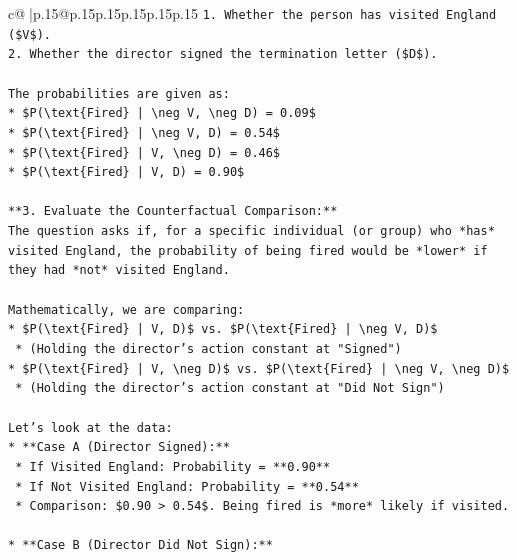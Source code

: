\documentclass{article}
\begin{document}
{\begin{supertabular}{c@{$\;$}|p{.15\linewidth}@{}p{.15\linewidth}p{.15\linewidth}p{.15\linewidth}p{.15\linewidth}p{.15\linewidth}}
{{{\texttt{1.  Whether the person has visited England (\$V\$).} \\
\texttt{2.  Whether the director signed the termination letter (\$D\$).} \\
\\ 
\texttt{The probabilities are given as:} \\
\texttt{*   \$P(\textbackslash{}text\{Fired\} | \textbackslash{}neg V, \textbackslash{}neg D) = 0.09\$} \\
\texttt{*   \$P(\textbackslash{}text\{Fired\} | \textbackslash{}neg V, D) = 0.54\$} \\
\texttt{*   \$P(\textbackslash{}text\{Fired\} | V, \textbackslash{}neg D) = 0.46\$} \\
\texttt{*   \$P(\textbackslash{}text\{Fired\} | V, D) = 0.90\$} \\
\\ 
\texttt{**3. Evaluate the Counterfactual Comparison:**} \\
\texttt{The question asks if, for a specific individual (or group) who *has* visited England, the probability of being fired would be *lower* if they had *not* visited England.} \\
\\ 
\texttt{Mathematically, we are comparing:} \\
\texttt{*   \$P(\textbackslash{}text\{Fired\} | V, D)\$ vs. \$P(\textbackslash{}text\{Fired\} | \textbackslash{}neg V, D)\$} \\
\texttt{    *   (Holding the director's action constant at "Signed")} \\
\texttt{*   \$P(\textbackslash{}text\{Fired\} | V, \textbackslash{}neg D)\$ vs. \$P(\textbackslash{}text\{Fired\} | \textbackslash{}neg V, \textbackslash{}neg D)\$} \\
\texttt{    *   (Holding the director's action constant at "Did Not Sign")} \\
\\ 
\texttt{Let's look at the data:} \\
\texttt{*   **Case A (Director Signed):**} \\
\texttt{    *   If Visited England: Probability = **0.90**} \\
\texttt{    *   If Not Visited England: Probability = **0.54**} \\
\texttt{    *   Comparison: \$0.90 > 0.54\$. Being fired is *more* likely if visited.} \\
\\ 
\texttt{*   **Case B (Director Did Not Sign):**} \\
}}}
\end{supertabular}}
\end{document}
